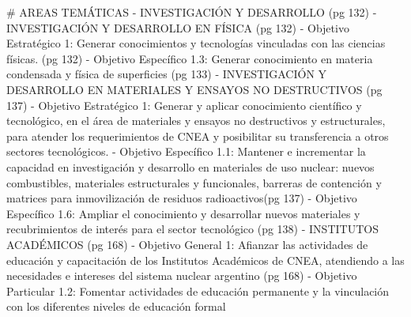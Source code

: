 # AREAS TEMÁTICAS
	- INVESTIGACIÓN Y DESARROLLO (pg 132)
		- INVESTIGACIÓN Y DESARROLLO EN FÍSICA (pg 132)
			- Objetivo Estratégico 1: Generar conocimientos y tecnologías vinculadas con las ciencias físicas. (pg 132)
				- Objetivo Específico 1.3: Generar conocimiento en materia condensada y física de superficies (pg 133)
		- INVESTIGACIÓN Y DESARROLLO EN MATERIALES Y ENSAYOS NO DESTRUCTIVOS (pg 137)
			- Objetivo Estratégico 1: Generar y aplicar conocimiento científico y tecnológico, en el área de materiales y ensayos no destructivos y estructurales, para atender los requerimientos de CNEA y posibilitar su transferencia a otros sectores tecnológicos.
				- Objetivo Específico 1.1: Mantener e incrementar la capacidad en investigación y desarrollo en materiales de uso nuclear: nuevos combustibles, materiales estructurales y funcionales, barreras de contención y matrices para inmovilización de residuos radioactivos(pg 137)
				- Objetivo Específico 1.6: Ampliar el conocimiento y desarrollar nuevos materiales y recubrimientos de interés para el sector tecnológico (pg 138)
	- INSTITUTOS ACADÉMICOS (pg 168)
		- Objetivo General 1: Afianzar las actividades de educación y capacitación de los Institutos Académicos de CNEA, atendiendo a las necesidades e intereses del sistema nuclear argentino (pg 168)
			- Objetivo Particular 1.2: Fomentar actividades de educación permanente y la vinculación con los diferentes niveles de educación formal



